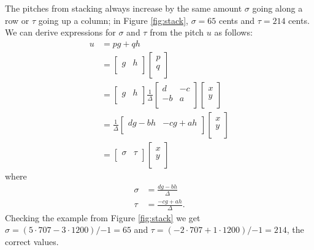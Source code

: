 \documentclass[a4paper,11pt]{article}
\begin{document}
\clearpage
The pitches from stacking always increase by the same amount $\sigma$ going
along a row or $\tau$ going up a column; in Figure \ref{fig:stack}, $\sigma =
65$ cents and $\tau = 214$ cents. We can derive expressions for $\sigma$ and
$\tau$ from the pitch $u$ as follows:
\begin{align}
u   &= p g + q h    \\
    &=
\begin{bmatrix}
    g   &   h   \\
\end{bmatrix}
\begin{bmatrix}
    p   \\
    q   \\
\end{bmatrix}   \\
    &=
\begin{bmatrix}
    g   &   h   \\
\end{bmatrix}
\frac{1}{\Delta}
\begin{bmatrix}
    d & -c \\
    -b & a \\
\end{bmatrix}
\begin{bmatrix}
    x \\
    y \\
\end{bmatrix}   \\
    &=
\frac{1}{\Delta}
\begin{bmatrix}
    d g - b h   &   -c g + a h  \\
\end{bmatrix}
\begin{bmatrix}
    x \\
    y \\
\end{bmatrix}   \\
    &=
\begin{bmatrix}
    \sigma  &   \tau   \\
\end{bmatrix}
\begin{bmatrix}
    x \\
    y \\
\end{bmatrix}
\end{align}
where
\begin{align}
    \sigma  &=  \frac{d g - b h}{\Delta}    \label{eq:mos-step-sizes-1}\\
    \tau    &=  \frac{-c g + a h}{\Delta}.  \label{eq:mos-step-sizes-2}
\end{align}
Checking the example from Figure \ref{fig:stack} we get $\sigma = (5 \cdot 707
- 3 \cdot 1200)/{-1} = 65$ and $\tau = (-2 \cdot 707 + 1 \cdot 1200)/{-1} =
214$, the correct values.
\end{document}
